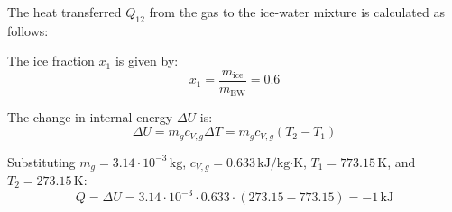 The heat transferred \( Q_{12} \) from the gas to the ice-water mixture is calculated as follows:  

The ice fraction \( x_1 \) is given by:  
\[
x_1 = \frac{m_{\text{ice}}}{m_{\text{EW}}} = 0.6
\]  

The change in internal energy \( \Delta U \) is:  
\[
\Delta U = m_g c_{V,g} \Delta T = m_g c_{V,g} (T_2 - T_1)
\]  

Substituting \( m_g = 3.14 \cdot 10^{-3} \, \text{kg} \), \( c_{V,g} = 0.633 \, \text{kJ/kg·K} \), \( T_1 = 773.15 \, \text{K} \), and \( T_2 = 273.15 \, \text{K} \):  
\[
Q = \Delta U = 3.14 \cdot 10^{-3} \cdot 0.633 \cdot (273.15 - 773.15) = -1 \, \text{kJ}
\]